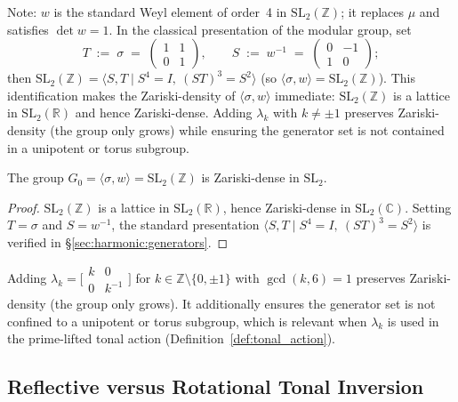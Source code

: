 Note: $w$ is the standard Weyl element of order~4 in $\mathrm{SL}_2(\mathbb{Z})$;
it replaces $\mu$ and satisfies $\det w = 1$.  In the classical presentation of the
modular group, set
\[
  T \;:=\; \sigma \;=\; \begin{pmatrix}1&1\\0&1\end{pmatrix}, \qquad
  S \;:=\; w^{-1} \;=\; \begin{pmatrix}0&-1\\1&0\end{pmatrix};
\]
then $\mathrm{SL}_2(\mathbb{Z}) = \langle S, T \mid S^4 = I,\ (ST)^3 = S^2 \rangle$
(so $\langle \sigma, w \rangle = \mathrm{SL}_2(\mathbb{Z})$).
This identification makes the Zariski-density of $\langle \sigma, w \rangle$
immediate: $\mathrm{SL}_2(\mathbb{Z})$ is a lattice in $\mathrm{SL}_2(\mathbb{R})$
and hence Zariski-dense.
Adding $\lambda_k$ with $k \neq \pm 1$ preserves Zariski-density (the group only grows)
while ensuring the generator set is not contained in a unipotent or torus subgroup.

\begin{lemma}
  \label{lem:generators_dense}
  The group $G_0 = \langle \sigma, w \rangle = \mathrm{SL}_2(\mathbb{Z})$
  is Zariski-dense in $\mathrm{SL}_2$.
\end{lemma}

\begin{proof}
  $\mathrm{SL}_2(\mathbb{Z})$ is a lattice in $\mathrm{SL}_2(\mathbb{R})$, hence
  Zariski-dense in $\mathrm{SL}_2(\mathbb{C})$.  Setting $T = \sigma$ and
  $S = w^{-1}$, the standard presentation
  $\langle S, T \mid S^4 = I,\ (ST)^3 = S^2 \rangle$
  is verified in \S\ref{sec:harmonic:generators}.
\end{proof}

\begin{remark}
  Adding $\lambda_k = \bigl[\begin{smallmatrix}k&0\\0&k^{-1}\end{smallmatrix}\bigr]$
  for $k \in \mathbb{Z} \setminus \{0, \pm 1\}$ with $\gcd(k,6)=1$ preserves
  Zariski-density (the group only grows).  It additionally ensures the generator set
  is not confined to a unipotent or torus subgroup, which is relevant when $\lambda_k$
  is used in the prime-lifted tonal action
  (Definition~\ref{def:tonal_action}).
\end{remark}

\subsection{Reflective versus Rotational Tonal Inversion}
\label{sec:harmonic:inversion_type}

